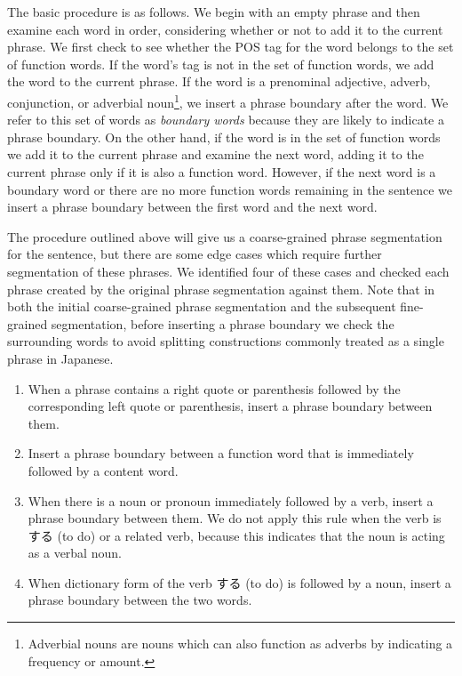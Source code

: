 \documentclass[english]{jnlp_1.4}
\begin{document}
The basic procedure is as follows. We begin with an empty phrase and
then examine each word in order, considering whether or not to add it
to the current phrase. We first check to see whether the POS tag for
the word belongs to the set of function words. If the word's tag is
not in the set of function words, we add the word to the current
phrase. If the word is a prenominal adjective, adverb, conjunction,
or adverbial noun\footnote{Adverbial nouns are nouns which can also
function as adverbs by indicating a frequency or amount.}, we insert a
phrase boundary after the word. We refer to this set of words as
\emph{boundary words} because they are likely to indicate a phrase
boundary. On the other hand, if the word is in the set of function
words we add it to the current phrase and examine the next word,
adding it to the current phrase only if it is also a function
word. However, if the next word is a boundary word or there are no
more function words remaining in the sentence we insert a phrase
boundary between the first word and the next word.

The procedure outlined above will give us a coarse-grained phrase
segmentation for the sentence, but there are some edge cases which
require further segmentation of these phrases. We identified four of
these cases and checked each phrase created by the original
phrase segmentation against them. Note that in both the initial
coarse-grained phrase segmentation and the subsequent fine-grained
segmentation, before inserting a phrase boundary we check the
surrounding words to avoid splitting constructions commonly treated as
a single phrase in Japanese.

\begin{enumerate}
\item When a phrase contains a right quote or
  parenthesis followed by the corresponding left quote or parenthesis,
  insert a phrase boundary between them.
\item Insert a phrase boundary between a function word that is
  immediately followed by a content word.
\item When there is a noun or pronoun immediately followed by a verb, insert a
  phrase boundary between them. We do not apply this rule when
  the verb is する (to do) or a related verb, because this indicates
  that the noun is acting as a verbal noun.
\item When dictionary form of the verb する (to do) is followed by a
  noun, insert a phrase boundary between the two words.
\end{enumerate}
\end{document}
